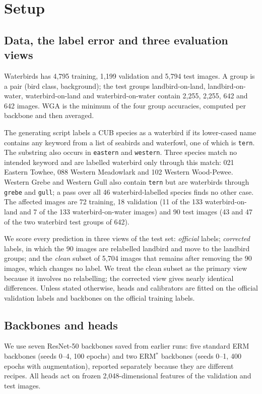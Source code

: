 \section{Setup}
\label{sec:setup}
\subsection{Data, the label error and three evaluation views}
Waterbirds has 4,795 training, 1,199 validation and 5,794 test images. A group is a pair (bird class, background); the test groups landbird-on-land, landbird-on-water, waterbird-on-land and waterbird-on-water contain 2,255, 2,255, 642 and 642 images. WGA is the minimum of the four group accuracies, computed per backbone and then averaged.

The generating script \cite{sagawa2020code} labels a CUB species as a waterbird if its lower-cased name contains any keyword from a list of seabirds and waterfowl, one of which is \texttt{tern}. The substring also occurs in \texttt{eastern} and \texttt{western}. Three species match no intended keyword and are labelled waterbird only through this match: 021 Eastern Towhee, 088 Western Meadowlark and 102 Western Wood-Pewee. Western Grebe and Western Gull also contain \texttt{tern} but are waterbirds through \texttt{grebe} and \texttt{gull}; a pass over all 46 waterbird-labelled species finds no other case. The affected images are 72 training, 18 validation (11 of the 133 waterbird-on-land and 7 of the 133 waterbird-on-water images) and 90 test images (43 and 47 of the two waterbird test groups of 642).

We score every prediction in three views of the test set: \emph{official} labels; \emph{corrected} labels, in which the 90 images are relabelled landbird and move to the landbird groups; and the \emph{clean} subset of 5,704 images that remains after removing the 90 images, which changes no label. We treat the clean subset as the primary view because it involves no relabelling; the corrected view gives nearly identical differences. Unless stated otherwise, heads and calibrators are fitted on the official validation labels and backbones on the official training labels.

\subsection{Backbones and heads}
We use seven ResNet-50 backbones saved from earlier runs: five standard ERM backbones (seeds 0--4, 100 epochs) and two ERM$^*$ backbones (seeds 0--1, 400 epochs with augmentation), reported separately because they are different recipes. All heads act on frozen 2,048-dimensional features of the validation and test images.

